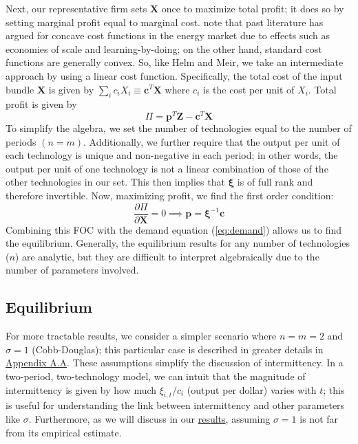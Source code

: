 \documentclass[11pt,a4paper,leqno]{extarticle}
\begin{document}
	
	Next, our representative firm sets $\mathbf{X}$ once to maximize total profit; it does so by setting marginal profit equal to marginal cost.  \citet{HH} note that past literature has argued for concave cost functions in the energy market due to effects such as economies of scale and learning-by-doing; on the other hand, standard cost functions are generally convex. So, like Helm and Meir, we take an intermediate approach by using a linear cost function. Specifically, the total cost of the input bundle $\mathbf{X}$ is given by $ \sum_i c_i X_i \equiv \mathbf{c}^T \mathbf{X}$ where $c_i$ is the cost per unit of $X_i$. Total profit is given by 
	\begin{equation}
	\Pi = \mathbf{p}^T \mathbf{Z} - \mathbf{c}^T \mathbf{X}
	\end{equation}
	To simplify the algebra, we set the number of technologies equal to the number of periods $(n=m)$. Additionally, we further require that the output per unit of each technology is unique and non-negative in each period; in other words, the output per unit of one technology is not a linear combination of those of the other technologies in our set. This then implies that $\boldsymbol{\xi}$ is of full rank and therefore invertible.  Now, maximizing profit, we find the first order condition:
	\begin{equation}\label{eq:firm_foc}
	\frac{\partial \Pi}{\partial \mathbf{X}} = 0 \implies \mathbf{p} =  \boldsymbol{\xi}^{-1} \mathbf{c}
	\end{equation}
	Combining this FOC with the demand equation (\autoref{eq:demand}) allows us to find the equilibrium. Generally, the equilibrium results for any number of technologies ($n$) are analytic, but they are difficult to interpret algebraically due to the number of parameters involved. 
	
	\subsection{Equilibrium}
	
	For more tractable results, we consider a simpler scenario where $n = m = 2$ and $\sigma = 1$ (Cobb-Douglas); this particular case is described in greater details in \hyperref[sec:cobbdoug]{Appendix A.A}. These assumptions simplify the discussion of intermittency. In a two-period, two-technology model, we can intuit that the magnitude of intermittency is given by how much $\xi_{i,t}/c_i$ (output per dollar) varies with $t$; this is useful for understanding the link between intermittency and other parameters like $\sigma$. Furthermore, as we will discuss in our \hyperref[sec:results]{results}, assuming $\sigma=1$ is not far from its empirical estimate.
	
\end{document}
